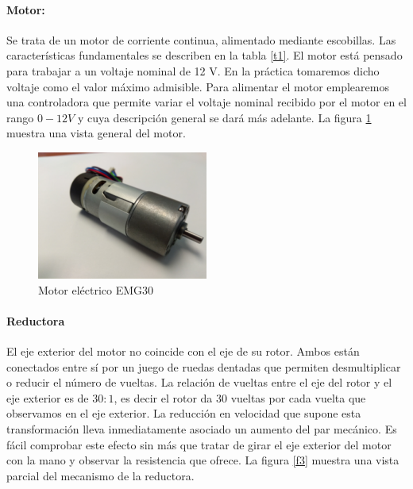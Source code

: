 \documentclass[10pt,a4paper]{report}
\begin{document}
\paragraph{Motor:}
Se trata de un motor de corriente continua, alimentado mediante escobillas. Las características fundamentales se describen en la tabla \ref{t1}. El motor está pensado para trabajar a un voltaje nominal de 12 V. En la práctica tomaremos dicho voltaje como el valor máximo admisible. Para alimentar el motor emplearemos una controladora que permite variar el voltaje nominal recibido por el motor en el rango $0-12V$ y cuya descripción general se dará más adelante. La figura \ref{f2} muestra una vista general del motor.
\begin{figure}
\centering
\includegraphics[width=0.5\textwidth]{emg30.jpg}
\caption{Motor eléctrico EMG30}\label{f2}
\end{figure}

\paragraph{Reductora}
El eje exterior del motor no coincide con el eje de su rotor. Ambos están conectados entre sí por un juego de ruedas dentadas que permiten desmultiplicar o reducir el número de vueltas. La relación de vueltas entre el eje del rotor y el eje exterior es de $30:1$, es decir el rotor da 30 vueltas por cada vuelta que observamos en el eje exterior. La reducción en velocidad que supone esta transformación lleva inmediatamente asociado un aumento del par mecánico. Es fácil comprobar este efecto sin más que tratar de girar el eje exterior del motor con la mano y observar la resistencia que ofrece. La figura \ref{f3} muestra una vista parcial del mecanismo de la reductora.
\end{document}
